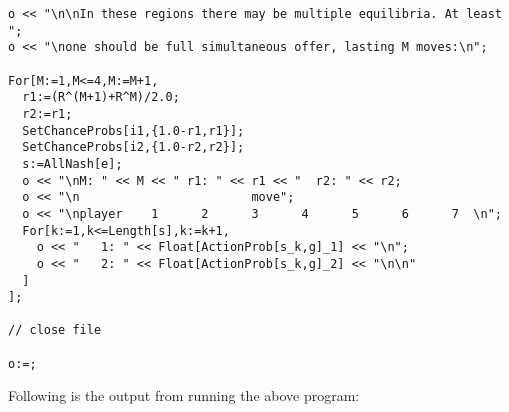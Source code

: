 {\begin{verbatim}
o << "\n\nIn these regions there may be multiple equilibria. At least ";
o << "\none should be full simultaneous offer, lasting M moves:\n";

For[M:=1,M<=4,M:=M+1,
  r1:=(R^(M+1)+R^M)/2.0;
  r2:=r1;
  SetChanceProbs[i1,{1.0-r1,r1}];
  SetChanceProbs[i2,{1.0-r2,r2}];
  s:=AllNash[e];
  o << "\nM: " << M << " r1: " << r1 << "  r2: " << r2;
  o << "\n                        move";
  o << "\nplayer    1      2      3      4      5      6      7  \n"; 
  For[k:=1,k<=Length[s],k:=k+1,
    o << "   1: " << Float[ActionProb[s_k,g]_1] << "\n";
    o << "   2: " << Float[ActionProb[s_k,g]_2] << "\n\n"
  ]
];

// close file

o:=;
\end{verbatim}
}

\noindent
Following is the output from running the above program:
